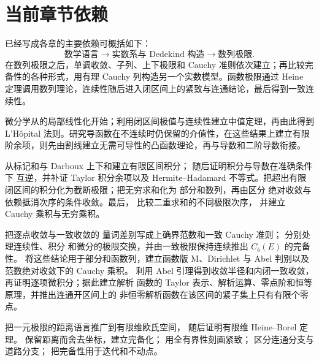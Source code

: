 \section{当前章节依赖}

已经写成各章的主要依赖可概括如下：
\[
 \text{数学语言}
 \longrightarrow
 \text{实数系与 Dedekind 构造}
 \longrightarrow
 \text{数列极限}.
\]
在数列极限之后，单调收敛、子列、上下极限和 Cauchy 准则依次建立；再比较完备性的各种形式，用有理 Cauchy 列构造另一个实数模型。函数极限通过 Heine 定理调用数列理论，连续性随后进入闭区间上的紧致与连通结论，最后得到一致连续性。

微分学从的局部线性化开始；利用闭区间极值与连续性建立中值定理，再由此得到 L'Hôpital 法则。研究导函数在不连续时仍保留的介值性，在这些结果上建立有限阶余项，则先由割线建立无需可导性的凸函数理论，再与导数和二阶导数衔接。

从标记和与 Darboux 上下和建立有限区间积分；
随后证明积分与导数在准确条件下
互逆，并补证 Taylor 积分余项以及 Hermite--Hadamard 不等式。把超出有限
闭区间的积分化为截断极限；把无穷求和化为
部分和数列，再由区分
绝对收敛与依赖抵消次序的条件收敛。最后，
比较二重求和的不同极限次序，
并建立 Cauchy 乘积与无穷乘积。

把逐点收敛与一致收敛的
量词差别写成上确界范数和一致 Cauchy 准则；
分别处理连续性、积分
和微分的极限交换，并由一致极限保持连续推出 \(C_b(E)\) 的完备性。
将这些结论用于部分和函数列，建立函数版
M、Dirichlet 与 Abel 判别以及范数绝对收敛下的 Cauchy 乘积。
利用 Abel 引理得到收敛半径和内闭一致收敛，
再证明逐项微积分；据此建立解析
函数的 Taylor 表示、解析运算、零点阶和恒等原理，并推出连通开区间上的
非恒零解析函数在该区间的紧子集上只有有限个零点。

把一元极限的距离语言推广到有限维欧氏空间，
随后证明有限维 Heine--Borel 定理。
保留距离而舍去坐标，建立完备化；
用全有界性刻画紧致；
区分连通分支与道路分支；
把完备性用于迭代和不动点。


